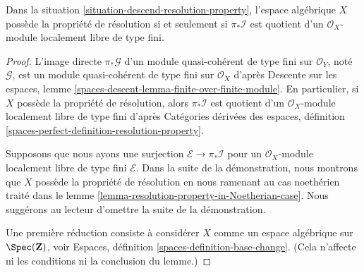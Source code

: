 \begin{lemma}
\label{lemma-resolution-property-one-sheaf}
Dans la situation \ref{situation-descend-resolution-property},
l'espace algébrique $X$ possède la propriété de résolution
si et seulement si $\pi_*\mathcal{I}$ est quotient d'un
$\mathcal{O}_X$-module localement libre de type fini.
\end{lemma}

\begin{proof}
L'image directe $\pi_*\mathcal{G}$ d'un module
quasi-cohérent de type fini sur $\mathcal{O}_Y$, noté $\mathcal{G}$, est un module
quasi-cohérent de type fini sur $\mathcal{O}_X$ d'après
Descente sur les espaces, lemme
\ref{spaces-descent-lemma-finite-over-finite-module}.
En particulier, si $X$ possède la propriété de résolution, alors $\pi_*\mathcal{I}$
est quotient d'un $\mathcal{O}_X$-module localement libre de type fini d'après
Catégories dérivées des espaces, définition
\ref{spaces-perfect-definition-resolution-property}.

\medskip\noindent
Supposons que nous ayons une surjection $\mathcal{E} \to \pi_*\mathcal{I}$
pour un $\mathcal{O}_X$-module localement libre de type fini $\mathcal{E}$.
Dans la suite de la démonstration, nous montrons que $X$ possède la propriété de résolution
en nous ramenant au cas noethérien traité dans le
lemme \ref{lemma-resolution-property-in-Noetherian-case}.
Nous suggérons au lecteur d'omettre la suite de la démonstration.

\medskip\noindent
Une première réduction consiste à considérer $X$ comme un espace algébrique sur
$\Spec(\mathbf{Z})$, voir
Espaces, définition \ref{spaces-definition-base-change}.
(Cela n'affecte ni les conditions ni la conclusion du lemme.)


\end{proof}

